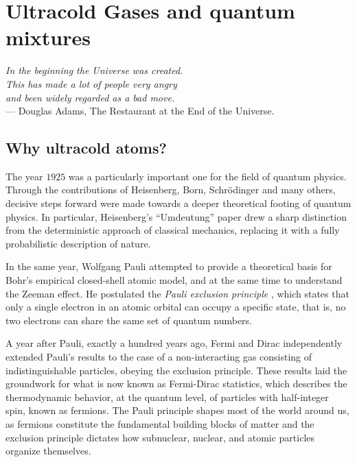 \chapter{Ultracold Gases and quantum mixtures}
\begin{flushright}{\slshape
		In the beginning the Universe was created.\\
		This has made a lot of people very angry \\ and been widely regarded as a bad move.}\\ \medskip
	\textnormal{--- Douglas Adams, {The Restaurant at the End of the Universe.} } %
\end{flushright}

\section{Why ultracold atoms?}

The year $1925$ was a particularly important one for the field of quantum physics. Through the contributions of Heisenberg, Born, Schr\"odinger and many others, decisive steps forward were made towards a deeper theoretical footing of quantum physics. In particular, Heisenberg's ``Umdeutung'' paper \cite{Heisenberg1925uqu} drew a sharp distinction from the deterministic approach of classical mechanics, replacing it with a fully probabilistic description of nature.

In the same year, Wolfgang Pauli attempted to provide a theoretical basis for   Bohr's empirical closed-shell atomic model, and at the same time to understand the Zeeman effect. He postulated the \textit{Pauli exclusion principle} \cite{Pauli1925udz}, which states that only a single electron in an atomic orbital can occupy a specific state, that is, no two electrons can share the same set of quantum numbers.

A year after Pauli, exactly a hundred years ago, Fermi \cite{Fermi1926zqd}  and Dirac \cite{Dirac1926ott} independently extended Pauli's results to the case of a non-interacting gas consisting of indistinguishable particles, obeying the exclusion principle. These results laid the groundwork for what is now known as Fermi-Dirac statistics, which describes the thermodynamic behavior, at the quantum level, of particles with half-integer spin, known as fermions. The Pauli principle shapes most of the world around us, as fermions constitute the fundamental building blocks of matter and the exclusion principle dictates how subnuclear, nuclear, and atomic particles organize themselves.

